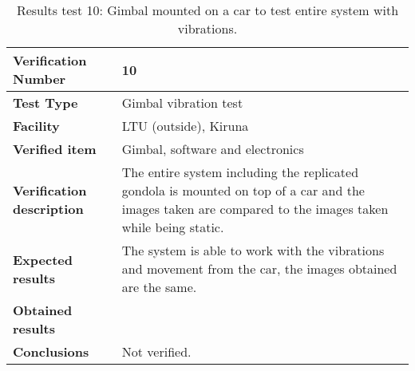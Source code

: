 \begin{table}[H]
\centering

\begin{tabular}{|m{}| m{} |}
\hline
\textbf{Verification Number} 		& 10 					\\ \hline
\textbf{Test Type} 					& Gimbal vibration test	\\ \hline
\textbf{Facility} 					& LTU (outside), Kiruna \\ \hline
\textbf{Verified item} 				& Gimbal, software and electronics \\ \hline

\textbf{Verification description} 	& The entire system including the replicated gondola is mounted on top of a car and the images taken are compared to the images taken while being static. \\ \hline

\textbf{Expected results} 			& The system is able to work with the vibrations and movement from the car, the images obtained are the same. \\ \hline

\textbf{Obtained results} 			& \\ \hline

\textbf{Conclusions} 				& Not verified.		\\ \hline
\end{tabular}
\caption{Results test 10: Gimbal mounted on a car to test entire system with vibrations.}
\label{tab:testresult10:gimbal-car}
\end{table}


\raggedbottom
